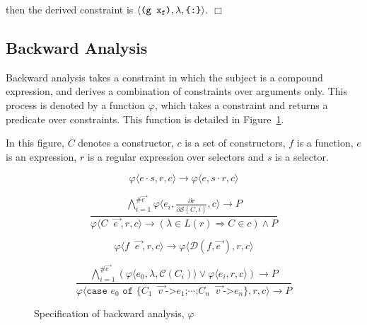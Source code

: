 \documentclass[preprint]{sigplanconf}
\newcommand{\T}[1]{\texttt{#1}}
\newcommand{\tup}[1]{\ensuremath{\langle #1 \rangle}}
\newcommand{\noexample}{\hfill$\Box$}
\newcommand{\D}{\ensuremath{\cdot}} %
\renewcommand{\c}[3]{\tup{\T{#1},\T{#2},\T{\{#3\}}}}
\newcommand{\cc}[2]{\c{#1}{$\lambda$}{#2}}
\newcommand{\s}[1]{\ensuremath{_{\tt #1}}} %
\newcommand{\vecto}[1]{\overrightarrow{#1\;}}
\newcommand{\gap}{\;\;}
\begin{document}
\noindent then the derived constraint is \cc{(g x\s{f})}{:}.
\noexample

\subsection{Backward Analysis}
\label{sec:backward}

Backward analysis takes a constraint in which the subject is a
compound expression, and derives a combination of constraints over
arguments only. This process is denoted by a function $\varphi$,
which takes a constraint and returns a predicate over constraints.
This function is detailed in Figure~\ref{fig:backward}.

In this figure, $C$ denotes a constructor, $c$ is a set of
constructors, $f$ is a function, $e$ is an expression, $r$ is a
regular expression over selectors and $s$ is a selector.

\begin{figure}

\renewcommand\theequation{sel}
\begin{equation}
    \varphi\tup{e\D{}s,r,c} \rightarrow
    \varphi\tup{e,s\D{}r,c}
\end{equation}

\renewcommand\theequation{con}
\begin{equation}
\frac
    {
        \bigwedge_{i=1}^{\#\vecto{e}}
        \varphi\tup{e_i,\frac{\partial r}{\partial \mathcal{S}(C,i)},c}
        \rightarrow P
    }
    {
        \varphi\tup{C \gap \vecto{e},r,c}
        \rightarrow (\lambda \in L(r) \Rightarrow C \in c) \wedge P
    }
\end{equation}

\renewcommand\theequation{app}
\begin{equation}
    \varphi\tup{f \gap \vecto{e},r,c} \rightarrow
    \varphi\tup{\mathcal{D}(f, \vecto{e}),r,c}
\end{equation}

\renewcommand\theequation{cas}
\begin{equation}
\frac
    {
        \bigwedge_{i=1}^{\#\vecto{e}}
        (
            \varphi\tup{e_0,\lambda,\mathcal{C}(C_i)} \vee
            \varphi\tup{e_i,r,c}
        ) \rightarrow P
    }
    {
        \varphi\tup{\T{case } e_0 \T{ of \{}C_1 \gap \vecto{v} \T{->} e_1\T{;} \cdots
        \T{;} C_n \gap \vecto{v} \T{->} e_n \},r,c} \rightarrow P
    }
\end{equation}

\caption{Specification of backward analysis, $\varphi$} %
\label{fig:backward}
\end{figure}
\end{document}

